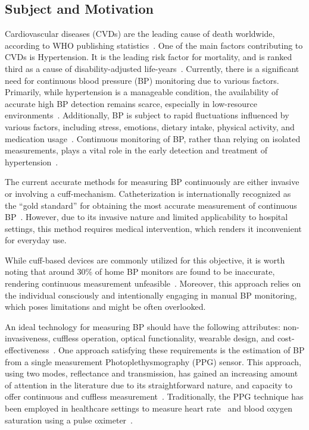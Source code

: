 \subsection{Subject and Motivation}
\label{subsec:subject_motivation}

Cardiovascular diseases (CVDs) are the leading cause of death worldwide, according to WHO publishing statistics~\cite{WorldHealthStatistics2023}.
One of the main factors contributing to CVDs is Hypertension.
It is the leading risk factor for mortality, and is ranked third as a cause of disability-adjusted life-years~\cite{ezzatiSelectedMajorRisk2002}.
Currently, there is a significant need for continuous blood pressure (BP) monitoring due to various factors.
Primarily, while hypertension is a manageable condition, the availability of accurate high BP detection remains scarce, especially in low-resource environments~\cite{burtPrevalenceHypertensionUS1995}.
Additionally, BP is subject to rapid fluctuations influenced by various factors, including stress, emotions, dietary intake, physical activity, and medication usage~\cite{poonCufflessNoninvasiveMeasurements2005}.
Continuous monitoring of BP, rather than relying on isolated measurements, plays a vital role in the early detection and treatment of hypertension~\cite{el-hajjDeepLearningModels2021}.

The current accurate methods for measuring BP continuously are either invasive or involving a cuff-mechanism.
Catheterization is internationally recognized as the \enquote{gold standard} for obtaining the most accurate measurement of continuous BP~\cite{sharmaCuffLessContinuousBlood2017}.
However, due to its invasive nature and limited applicability to hospital settings, this method requires medical intervention, which renders it inconvenient for everyday use.

While cuff-based devices are commonly utilized for this objective, it is worth noting that around 30\% of home BP monitors are found to be inaccurate, rendering continuous measurement unfeasible~\cite{leungHypertensionCanada20162016, seboBloodPressureMeasurements2014}.
Moreover, this approach relies on the individual consciously and intentionally engaging in manual BP monitoring, which poses limitations and might be often overlooked.

An ideal technology for measuring BP should have the following attributes: non-invasiveness, cuffless operation, optical functionality, wearable design, and cost-effectiveness~\cite{el-hajjDeepLearningModels2021}.
One approach satisfying these requirements is the estimation of BP from a single measurement Photoplethysmography (PPG) sensor.
This approach, using two modes, reflectance and transmission, has gained an increasing amount of attention in the literature due to its straightforward nature, and capacity to offer continuous and cuffless measurement~\cite{el-hajjDeepLearningModels2021}.
Traditionally, the PPG technique has been employed in healthcare settings to measure heart rate~\cite{reyesWirelessPhotoplethysmographicDevice2012} and blood oxygen saturation using a pulse oximeter~\cite{yoonMultipleDiagnosisBased2002}.

